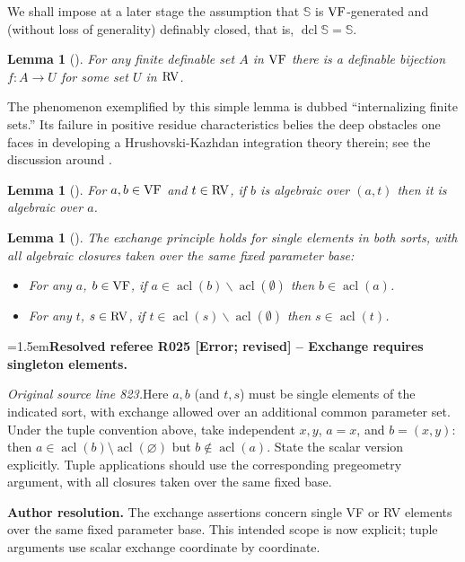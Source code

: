 \documentclass[12pt]{amsart}
\newcommand{\ResolvedRefereeRemark}[5]{%
  \par\medskip\begingroup\normalfont\small\color{gray}%
  \emergencystretch=1.5em\noindent\textbf{Resolved referee R#1 [#2] -- #3.}\par\nobreak\noindent #4\par
  \medskip\color{ResolutionGreen}\noindent\textbf{Author resolution.} #5\par
  \endgroup\medskip
}
\theoremstyle{plain}
\newtheorem{lem}[thm]{Lemma}
\theoremstyle{definition}
\theoremstyle{remark}
\numberwithin{equation}{section}
\theoremstyle{plain}
\newcommand{\VF}{\textup{VF}}
\newcommand{\RV}{\textup{RV}}
\DeclareMathOperator{\acl}{acl}
\DeclareMathOperator{\dcl}{dcl}
\newcommand{\0}{\emptyset}
\newcommand{\fun}{\longrightarrow}
\newcommand{\mi}{\smallsetminus}
\begin{document}
We shall impose at a later stage the assumption that $\mathbb{S}$ is $\VF$-generated and (without loss of generality) definably closed,  that is, $\dcl \mathbb{S} = \mathbb{S}$.

\begin{lem}[{\cite[Lemma~4.10]{Yin:QE:ACVF:min}}]\label{finite:VF:project:RV}
For any finite definable set $A$ in $\VF$ there is a definable bijection $f : A \fun U$ for some set $U$ in $\RV$.
\end{lem}

The phenomenon exemplified by this simple lemma is dubbed ``internalizing finite sets.'' Its failure in positive residue characteristics belies the deep obstacles one faces in developing a Hrushovski-Kazhdan integration theory therein; see the discussion around \cite[Lemma~3.9]{hrushovski:kazhdan:integration:vf}.

\begin{lem}[{\cite[Lemma~3.3]{Yin:special:trans}}]\label{dcl:to:ac}
For $a, b \in \VF$ and $t \in \RV$, if $b$ is algebraic over $(a, t)$ then it is algebraic over $a$.
\end{lem}

\begin{lem}[{\cite[Lemma~4.3]{Yin:QE:ACVF:min}}]\label{exchange}
The exchange principle holds for single elements in both sorts, with all algebraic closures taken over the same fixed parameter base:
\begin{itemize}
 \item For any $a$, $b \in \VF$, if $a \in \acl(b) \mi \acl(\0)$ then $b \in \acl(a)$.
 \item For any $t$, $s \in \RV$, if $t \in \acl(s) \mi \acl(\0)$ then $s \in \acl(t)$.
\end{itemize}
\end{lem}

\ResolvedRefereeRemark{025}{Error; revised}{Exchange requires singleton elements}{%
\textit{Original source line 823.}\quad Here $a,b$ (and $t,s$) must be single elements of the indicated sort, with exchange allowed over an additional common parameter set. Under the tuple convention above, take independent $x,y$, $a=x$, and $b=(x,y)$: then $a\in\acl(b)\setminus\acl(\varnothing)$ but $b\notin\acl(a)$. State the scalar version explicitly. Tuple applications should use the corresponding pregeometry argument, with all closures taken over the same fixed base.
}{The exchange assertions concern single VF or RV elements over the same fixed parameter base. This intended scope is now explicit; tuple arguments use scalar exchange coordinate by coordinate.}
\end{document}
